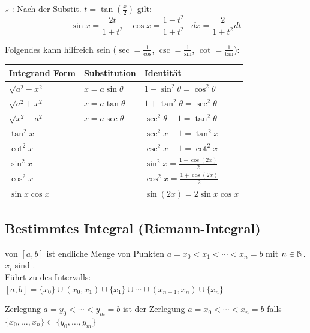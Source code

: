 \Satz $\star$ : Nach der Substit. $t = \tan(\frac{x}{2})$ gilt:
$$\sin x = \frac{2t}{1 + t^2} \hspace{10pt} \cos x = \frac{1 - t^2}{1 + t^2} \hspace{10pt} dx = \frac{2}{1 + t^2} dt$$

\begin{minipage}{\linewidth}
\Satz Folgendes kann hilfreich sein
($\sec = \frac{1}{\cos}$, $\csc = \frac{1}{\sin}$, $\cot = \frac{1}{\tan}$):

\begin{tabular}{l l l}
    Integrand Form & Substitution & Identität \\
    \hline
    $\sqrt{a^2 - x^2}$ & $x = a \sin \theta$ & $1 - \sin^2 \theta = \cos^2 \theta$ \\
    $\sqrt{a^2 + x^2}$ & $x = a \tan \theta$ & $1 + \tan^2 \theta = \sec^2 \theta$ \\
    $\sqrt{x^2 - a^2}$ & $x = a \sec \theta$ & $\sec^2 \theta - 1 = \tan^2 \theta$ \\
    $\tan^2 x$         &                     & $\sec^2 x - 1 = \tan^2 x$ \\
    $\cot^2 x$         &                     & $\csc^2 x - 1 = \cot^2 x$ \\
    $\sin^2 x$         &                     & $\sin^2 x = \frac{1 - \cos(2x)}{2}$ \\
    $\cos^2 x$         &                     & $\cos^2 x = \frac{1 + \cos(2x)}{2}$ \\
    $\sin x \cos x$    &                     & $\sin(2x) = 2 \sin x \cos x$
\end{tabular}
\end{minipage}

\subsection{Bestimmtes Integral (Riemann-Integral)}

\Def {} von $[a, b]$ ist endliche Menge von Punkten
$a = x_0 < x_1 < \cdots < x_n = b$ mit $n \in \mathbb{N}$. $x_i$ sind . \\
Führt zu  des Intervalls:
$[a, b] = \{x_0\} \cup (x_0, x_1) \cup \{x_1\} \cup \cdots \cup (x_{n-1}, x_n) \cup \{x_n\}$

\Def Zerlegung $a = y_0 < \cdots < y_m = b$ ist  der Zerlegung
$a = x_0 < \cdots < x_n = b$ falls $\{x_0, \ldots, x_n\} \subset \{y_0, \ldots, y_m\}$

